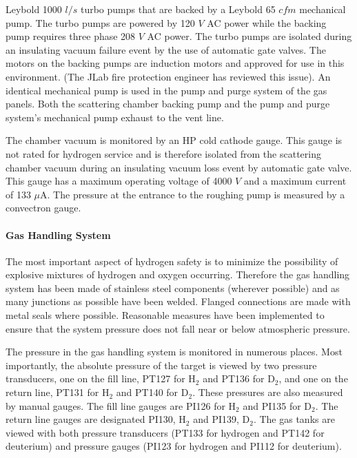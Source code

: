 \begin{safetyen}{0}{0}
{\begin{description}
Leybold 1000 $l/s$ turbo pumps that are backed by a Leybold 65 $cfm$
mechanical pump. The turbo pumps are powered by 120 $V$ AC power
while the backing pump requires three phase 208 $V$ AC power. The
turbo pumps are isolated during an insulating vacuum failure event
by the use of automatic gate valves. The motors on the backing pumps
are induction motors and approved for use in this environment. (The
JLab fire protection engineer has reviewed this issue). An identical
mechanical pump is used in the pump and purge system of the gas panels.
Both the scattering chamber backing pump and the pump and purge system's
mechanical pump exhaust to the vent line.
\item [{\bf Vacuum Gauges}] The chamber vacuum is monitored by an HP cold
cathode gauge. This gauge is not rated for hydrogen service and is
therefore isolated from the scattering chamber vacuum during an insulating
vacuum loss event by automatic gate valve. This gauge has a maximum
operating voltage of 4000 $V$ and a maximum current of 133 $\mu$A.
The pressure at the entrance to the roughing pump is measured by a
convectron gauge. 
\end{description}
}

\paragraph{Gas Handling System}

The most important aspect of hydrogen safety is to minimize the possibility
of explosive mixtures of hydrogen and oxygen occurring. Therefore
the gas handling system has been made of stainless steel components
(wherever possible) and as many junctions as possible have been welded.
Flanged connections are made with metal seals where possible. Reasonable
measures have been implemented to ensure that the system pressure
does not fall near or below atmospheric pressure.

The pressure in the gas handling system is monitored in numerous places.
Most importantly, the absolute pressure of the target is viewed by
two pressure transducers, one on the fill line, PT127 for H$_{2}$
and PT136 for D$_{2}$, and one on the return line, PT131 for H$_{2}$
and PT140 for D$_{2}$. These pressures are also measured by manual
gauges. The fill line gauges are PI126 for H$_{2}$ and PI135 for
D$_{2}$. The return line gauges are designated PI130, H$_{2}$ and
PI139, D$_{2}$. The gas tanks are viewed with both pressure transducers
(PT133 for hydrogen and PT142 for deuterium) and pressure gauges (PI123
for hydrogen and PI112 for deuterium).


\end{safetyen}
